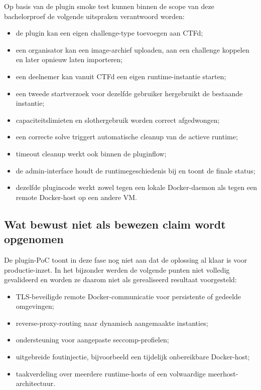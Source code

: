 Op basis van de plugin smoke test kunnen binnen de scope van deze bachelorproef de volgende uitspraken verantwoord worden:

\begin{itemize}
  \item de plugin kan een eigen challenge-type toevoegen aan CTFd;
  \item een organisator kan een image-archief uploaden, aan een challenge koppelen en later opnieuw laten importeren;
  \item een deelnemer kan vanuit CTFd een eigen runtime-instantie starten;
  \item een tweede startverzoek voor dezelfde gebruiker hergebruikt de bestaande instantie;
  \item capaciteitslimieten en slothergebruik worden correct afgedwongen;
  \item een correcte solve triggert automatische cleanup van de actieve runtime;
  \item timeout cleanup werkt ook binnen de pluginflow;
  \item de admin-interface houdt de runtimegeschiedenis bij en toont de finale status;
  \item dezelfde plugincode werkt zowel tegen een lokale Docker-daemon als tegen een remote Docker-host op een andere VM.
\end{itemize}

\subsection{Wat bewust niet als bewezen claim wordt opgenomen}

De plugin-PoC toont in deze fase nog niet aan dat de oplossing al klaar is voor productie-inzet. In het bijzonder werden de volgende punten niet volledig gevalideerd en worden ze daarom niet als gerealiseerd resultaat voorgesteld:

\begin{itemize}
  \item TLS-beveiligde remote Docker-communicatie voor persistente of gedeelde omgevingen;
  \item reverse-proxy-routing naar dynamisch aangemaakte instanties;
  \item ondersteuning voor aangepaste seccomp-profielen;
  \item uitgebreide foutinjectie, bijvoorbeeld een tijdelijk onbereikbare Docker-host;
  \item taakverdeling over meerdere runtime-hosts of een volwaardige meerhost-architectuur.
\end{itemize}
\label{sec:validatie-todo}

